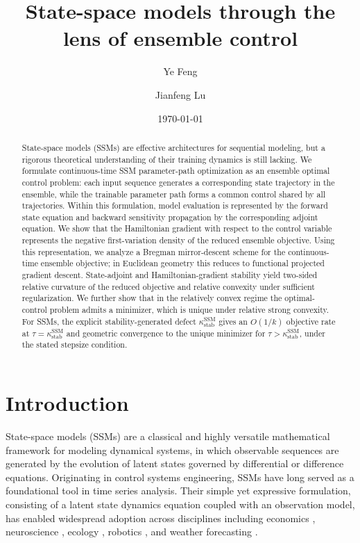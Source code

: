 \documentclass[11pt]{amsart}
\title{State-space models through the lens of ensemble control}
\date{\today}
\author{Ye Feng}
\author{Jianfeng Lu}
\numberwithin{equation}{section} %
\theoremstyle{remark}
\begin{document}
\begin{abstract}
State-space models (SSMs) are effective architectures for sequential modeling, but
a rigorous theoretical understanding of their training dynamics is still lacking.
We formulate continuous-time SSM parameter-path optimization as an ensemble optimal
control problem: each input sequence generates a corresponding state trajectory in
the ensemble, while the trainable parameter path forms a common control shared by
all trajectories. Within this formulation, model evaluation is represented by the
forward state equation and backward sensitivity propagation by the corresponding
adjoint equation. We show that the Hamiltonian gradient with respect to the control
variable represents the negative first-variation density of the reduced ensemble
objective. Using this representation, we analyze a Bregman mirror-descent scheme
for the continuous-time ensemble objective; in Euclidean geometry this reduces to
functional projected gradient descent. State-adjoint and Hamiltonian-gradient
stability yield two-sided relative curvature of the reduced objective and relative
convexity under sufficient regularization. We further show that in the relatively
convex regime the optimal-control problem admits a minimizer, which is unique under
relative strong convexity. For SSMs, the explicit stability-generated defect
$\kappa_{\mathrm{stab}}^{\mathrm{SSM}}$ gives an $O(1/k)$ objective rate at
$\tau=\kappa_{\mathrm{stab}}^{\mathrm{SSM}}$ and geometric convergence to the
unique minimizer for $\tau>\kappa_{\mathrm{stab}}^{\mathrm{SSM}}$, under the
stated stepsize condition.
\end{abstract}

\maketitle

\section{Introduction}

State-space models (SSMs) are a classical and highly versatile mathematical framework for modeling dynamical systems, in which observable sequences are generated by the evolution of latent states governed by differential or difference equations. Originating in control systems engineering, SSMs have long served as a foundational tool in time series analysis. Their simple yet expressive formulation, consisting of a latent state dynamics equation coupled with an observation model, has enabled widespread adoption across disciplines including economics \cite{zeng2013state}, neuroscience \cite{linderman2017bayesian,zoltowski2020general}, ecology \cite{glennie2023hidden,newman2023state}, robotics \cite{liu2024robomamba, liu2024point}, and weather forecasting \cite{yang2025wssm}.
\end{document}
